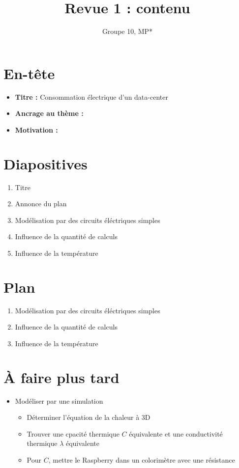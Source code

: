 \documentclass[french]{article}
\title{Revue 1 : contenu}
\author{Groupe 10, MP*}
\begin{document}
\maketitle

\section{En-tête}

\begin{itemize}
    \item \textbf{Titre :} Consommation électrique d'un data-center
    \item \textbf{Ancrage au thème :}
    \item \textbf{Motivation :}
\end{itemize}

\section{Diapositives}

\begin{enumerate}
    \item Titre
    \item Annonce du plan
    \item Modélisation par des circuits éléctriques simples
    \item Influence de la quantité de calculs
    \item Influence de la température
\end{enumerate}

\section{Plan}

\begin{enumerate}
    \item Modélisation par des circuits éléctriques simples
    \item Influence de la quantité de calculs
    \item Influence de la température
\end{enumerate}

\section{À faire plus tard}

\begin{itemize}
    \item Modéliser par une simulation
    \begin{itemize}
        \item Déterminer l'équation de la chaleur à 3D
        \item Trouver une cpacité thermique $C$ équivalente et une conductivité thermique $\lambda$ équivalente
        \item Pour $C$, mettre le Raspberry dans un colorimètre avec une résistance

    \end{itemize}
\end{itemize}
\end{document}
